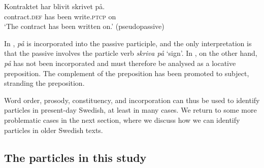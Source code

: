 \documentclass[output=paper]{langscibook}
\begin{document}
\ex\label{ex:lalu:14b}
\gll  Kontraktet     har   blivit   skrivet     på. \\
    contract\textsc{.def}   has   been   write.\textsc{ptcp}   on\\
\glt `The contract has been written on.’ (pseudopassive)\\
\z
\z


In , \textit{på} is incorporated into the passive participle, and the only interpretation is that the passive involves the particle verb \textit{skriva på} ‘sign’. In , on the other hand, \textit{på} has not been incorporated and must therefore be analysed as a locative preposition. The complement of the preposition has been promoted to subject, stranding the preposition.



Word order, prosody, constituency, and incorporation can thus be used to identify particles in present-day Swedish, at least in many cases. We return to some more problematic cases in the next section, where we discuss how we can identify particles in older Swedish texts. 


\subsection{The particles in this study}\label{sec:lalu:2.3}
\end{document}
